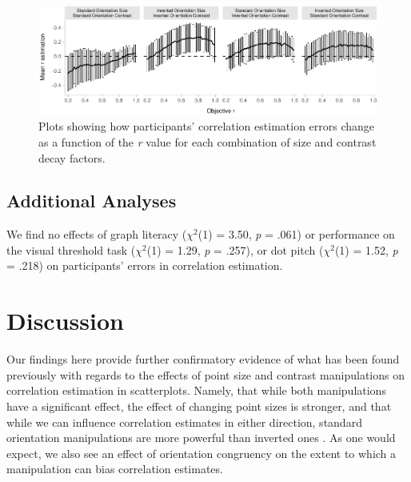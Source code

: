 \documentclass[manuscript, review, anonymous, screen]{acmart}
\begin{document}
\begin{figure}

{\centering \includegraphics[width=1\textwidth,height=\textheight]{size_and_contrast_new_files/figure-pdf/fig-diff-error-bars-plot-1.pdf}

}

\caption{\label{fig-diff-error-bars-plot}Plots showing how participants'
correlation estimation errors change as a function of the \emph{r} value
for each combination of size and contrast decay factors.}

\end{figure}

\hypertarget{sec-add-analyses}{%
\subsection{Additional Analyses}\label{sec-add-analyses}}

We find no effects of graph literacy (\(\chi^2\)(1) = 3.50, \emph{p} =
.061) or performance on the visual threshold task (\(\chi^2\)(1) = 1.29,
\emph{p} = .257), or dot pitch (\(\chi^2\)(1) = 1.52, \emph{p} = .218)
on participants' errors in correlation estimation.

\hypertarget{sec-discussion}{%
\section{Discussion}\label{sec-discussion}}

Our findings here provide further confirmatory evidence of what has been
found previously with regards to the effects of point size and contrast
manipulations on correlation estimation in scatterplots. Namely, that
while both manipulations have a significant effect, the effect of
changing point sizes is stronger, and that while we can influence
correlation estimates in either direction, standard orientation
manipulations are more powerful than inverted ones
\citep{strain_2023, strain_2023b}. As one would expect, we also see an
effect of orientation congruency on the extent to which a manipulation
can bias correlation estimates.
\end{document}
